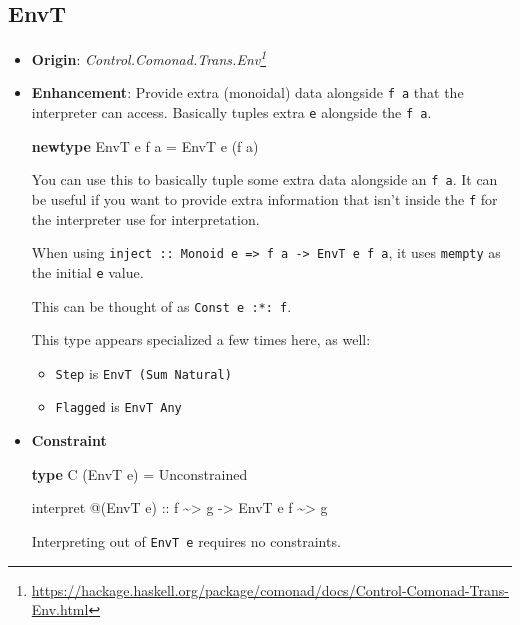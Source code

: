 \documentclass[]{article}
\newenvironment{Shaded}{}{}
\newcommand{\DataTypeTok}[1]{\textcolor[rgb]{0.56,0.13,0.00}{#1}}
\newcommand{\KeywordTok}[1]{\textcolor[rgb]{0.00,0.44,0.13}{\textbf{#1}}}
\newcommand{\NormalTok}[1]{#1}
\newcommand{\OperatorTok}[1]{\textcolor[rgb]{0.40,0.40,0.40}{#1}}
\newcommand{\OtherTok}[1]{\textcolor[rgb]{0.00,0.44,0.13}{#1}}
\renewcommand{\href}[2]{#2\footnote{\url{#1}}}
\begin{document}
\hypertarget{envt}{%
\subsection{EnvT}\label{envt}}

\begin{itemize}
\item
  \textbf{Origin}:
  \emph{\href{https://hackage.haskell.org/package/comonad/docs/Control-Comonad-Trans-Env.html}{Control.Comonad.Trans.Env}}
\item
  \textbf{Enhancement}: Provide extra (monoidal) data alongside \texttt{f\ a}
  that the interpreter can access. Basically tuples extra \texttt{e} alongside
  the \texttt{f\ a}.

\begin{Shaded}
\begin{Highlighting}[]
\KeywordTok{newtype} \DataTypeTok{EnvT}\NormalTok{ e f a }\OtherTok{=} \DataTypeTok{EnvT}\NormalTok{ e (f a)}
\end{Highlighting}
\end{Shaded}

  You can use this to basically tuple some extra data alongside an
  \texttt{f\ a}. It can be useful if you want to provide extra information that
  isn't inside the \texttt{f} for the interpreter use for interpretation.

  When using
  \texttt{inject\ ::\ Monoid\ e\ =\textgreater{}\ f\ a\ -\textgreater{}\ EnvT\ e\ f\ a},
  it uses \texttt{mempty} as the initial \texttt{e} value.

  This can be thought of as \texttt{Const\ e\ :*:\ f}.

  This type appears specialized a few times here, as well:

  \begin{itemize}
  \tightlist
  \item
    \texttt{Step} is \texttt{EnvT\ (Sum\ Natural)}
  \item
    \texttt{Flagged} is \texttt{EnvT\ Any}
  \end{itemize}
\item
  \textbf{Constraint}

\begin{Shaded}
\begin{Highlighting}[]
\KeywordTok{type} \DataTypeTok{C}\NormalTok{ (}\DataTypeTok{EnvT}\NormalTok{ e) }\OtherTok{=} \DataTypeTok{Unconstrained}

\NormalTok{interpret }\OperatorTok{@}\NormalTok{(}\DataTypeTok{EnvT}\NormalTok{ e)}
\OtherTok{    ::}\NormalTok{ f }\OperatorTok{\textasciitilde{}>}\NormalTok{ g}
    \OtherTok{{-}>} \DataTypeTok{EnvT}\NormalTok{ e f }\OperatorTok{\textasciitilde{}>}\NormalTok{ g}
\end{Highlighting}
\end{Shaded}

  Interpreting out of \texttt{EnvT\ e} requires no constraints.
\end{itemize}
\end{document}
